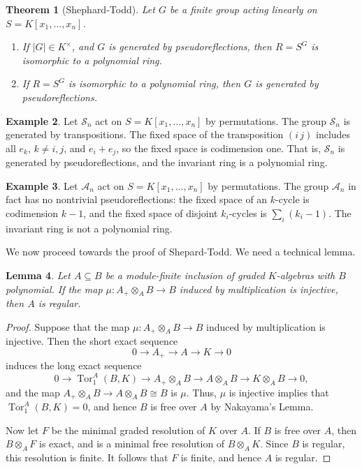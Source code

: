 \documentclass[12pt]{amsart}
\newtheorem{theorem}{Theorem}[section]
\newtheorem{lemma}[theorem]{Lemma}
\theoremstyle{definition}
\newtheorem{example}[theorem]{Example}
\numberwithin{equation}{theorem}
\def\Tor{\operatorname{Tor}}
\def\to{\longrightarrow}
\begin{document}
\begin{theorem}[Shephard-Todd] Let $G$ be a finite group acting linearly on $S=K[x_1,\dots,x_n]$.
\begin{enumerate}
\item If $|G|\in K^\times$, and $G$ is generated by pseudoreflections, then $R=S^G$ is isomorphic to a polynomial ring.
\item If $R=S^G$ is isomorphic to a polynomial ring, then $G$ is generated by pseudoreflections.
\end{enumerate}
\end{theorem}


\begin{example}
Let $\mathcal{S}_n$ act on $S=K[x_1,\dots,x_n]$ by permutations. The group $\mathcal{S}_n$ is generated by transpositions. The fixed space of the transposition $(i\, j)$ includes all $e_k$, $k\neq i,j$, and $e_i + e_j$, so the fixed space is codimension one. That is, $\mathcal{S}_n$ is generated by pseudoreflections, and the invariant ring is a polynomial ring.
\end{example}

\begin{example}
Let $\mathcal{A}_n$ act on $S=K[x_1,\dots,x_n]$ by permutations. The group $\mathcal{A}_n$ in fact has no nontrivial pseudoreflections: the fixed space of an $k$-cycle is codimension $k-1$, and the fixed space of disjoint $k_i$-cycles is $\sum_i (k_i -1)$.
The invariant ring is not a polynomial ring.
\end{example}




We now proceed towards the proof of Shepard-Todd. We need a technical lemma.

\begin{lemma} Let $A\subseteq B$ be a module-finite inclusion of graded $K$-algebras with $B$ polynomial. If the map $\mu: A_+ \otimes_A B \to B$ induced by multiplication is injective, then $A$ is regular.
\end{lemma}
\begin{proof}
Suppose that the map $\mu: A_+ \otimes_A B \to B$ induced by multiplication is injective. Then the short exact sequence
\[ 0 \to A_+ \to A \to K \to 0\]
induces the long exact sequence
\[ 0 \to \Tor^A_1(B,K) \to A_+ \otimes_A B \to A \otimes_A B \to K \otimes_A B \to 0,\]
and the map $A_+ \otimes_A B \to A \otimes_A B\cong B$ is $\mu$. Thus, $\mu$ is injective implies that $\Tor^A_1(B,K)=0$, and hence $B$ is free over $A$ by Nakayama's Lemma.

Now let $F$ be the minimal graded resolution of $K$ over $A$. If $B$ is free over $A$, then $B\otimes_A F$ is exact, and is a minimal free resolution of $B\otimes_A K$. Since $B$ is regular, this resolution is finite. It follows that $F$ is finite, and hence $A$ is regular.
\end{proof}
\end{document}
